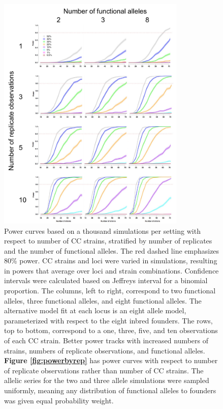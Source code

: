 \begin{figure}
\renewcommand{\familydefault}{\sfdefault}\normalfont
\centering
\includegraphics[width=0.8\textwidth, trim={0.1in 0in 0in 0in}, clip]{figures/3-sparcc/power_by_strain_panel.pdf}
\caption[Panel of power curves with respect to number of CC strains]{Power curves based on a thousand simulations per setting with respect to number of CC strains, stratified by number of replicates and the number of functional alleles. The red dashed line emphasizes 80\% power. CC strains and loci were varied in simulations, resulting in powers that average over loci and strain combinations. Confidence intervals were calculated based on Jeffreys interval for a binomial proportion. The columns, left to right, correspond to two functional alleles, three functional alleles, and eight functional alleles. The alternative model fit at each locus is an eight allele model, parameterized with respect to the eight inbred founders. The rows, top to bottom, correspond to a one, three, five, and ten observations of each CC strain. Better power tracks with increased numbers of strains, numbers of replicate observations, and functional alleles. \textbf{Figure \ref{fig:powerbyrep}} has power curves with respect to number of replicate observations rather than number of CC strains. The allelic series for the two and three allele simulations were sampled uniformly, meaning any distribution of functional alleles to founders was given equal probability weight. \label{fig:powerbystrain}}
\end{figure}

